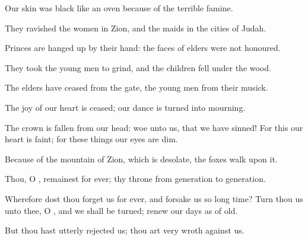 \verse Our skin was black like an oven because of the terrible famine.

\verse They ravished the women in Zion, and the maids in the cities of Judah.

\verse Princes are hanged up by their hand: the faces of elders were not honoured.

\verse They took the young men to grind, and the children fell under the wood.

\verse The elders have ceased from the gate, the young men from their musick.

\verse The joy of our heart is ceased; our dance is turned into mourning.

\verse The crown is fallen from our head: woe unto us, that we have sinned!  \verse For this our heart is faint; for these things our eyes are dim.

\verse Because of the mountain of Zion, which is desolate, the foxes walk upon it.

\verse Thou, O \LORD, remainest for ever; thy throne from generation to generation.

\verse Wherefore dost thou forget us for ever, and forsake us so long time?  \verse Turn thou us unto thee, O \LORD, and we shall be turned; renew our days as of old.

\verse But thou hast utterly rejected us; thou art very wroth against us.

